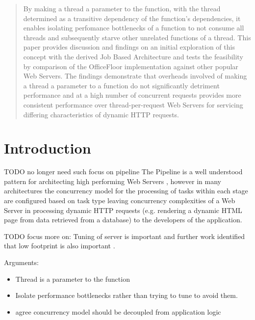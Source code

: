 \documentclass[conference]{ieee/IEEEtran}
\begin{document}
\begin{abstract}
By making a thread a parameter to the function, with the thread determined as a
transitive dependency of the function's dependencies, it enables isolating
perfomance bottlenecks of a function to not consume all threads and
subsequently starve other unrelated functions of a thread.  This paper provides
discussion and findings on an initial exploration of this concept with the
derived Job Based Architecture and tests the feasibility by comparison of the
OfficeFloor implementation against other popular Web Servers.  The findings
demonstrate that overheads involved of making a thread a parameter to a
function do not significantly detriment performance and at a high number of
concurrent requests provides more consistent performance over
thread-per-request Web Servers for servicing differing characteristics of
dynamic HTTP requests.
\end{abstract}




%
\IEEEpeerreviewmaketitle



\section{Introduction}

TODO no longer need such focus on pipeline The Pipeline \cite{pipeline} is a
well understood pattern for architecting high performing Web Servers
\cite{multithread-pipeline,knot-userver-watpipe,seda}, however in many
architectures \cite{multithread-pipeline,flux,aspen} the concurrency model for
the processing of tasks within each stage are configured based on task type
leaving concurrency complexities of a Web Server in processing dynamic HTTP
requests (e.g. rendering a dynamic HTML page from data retrieved from a
database) to the developers of the application.

TODO focus more on:
Tuning of server is important \cite{tuning-important} and further work
identified that low footprint is also important \cite{knot-userver-watpipe}.

Arguments:
\begin{itemize}
  \item Thread is a parameter to the function
  \item Isolate performance bottlenecks rather than trying to tune to avoid
  them.
  \item agree concurrency model should be decoupled from application logic
\end{itemize}
\end{document}
